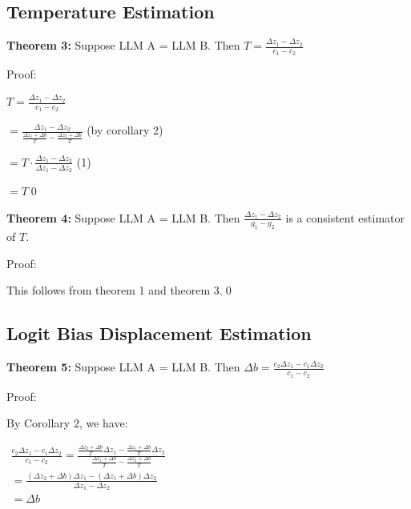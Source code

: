\documentclass{article}
\begin{document}
\subsection{Temperature Estimation}

\textbf{Theorem 3:} Suppose LLM A = LLM B. Then $\displaystyle T=\frac{\Delta z_{1} -\Delta z_{2}}{c_{1} -c_{2}}$

Proof:

$\displaystyle T=\frac{\Delta z_{1} -\Delta z_{2}}{c_{1} -c_{2}}$

$\displaystyle =\frac{\Delta z_{1} -\Delta z_{2}}{\frac{\Delta z_{1} +\Delta b}{T} -\frac{\Delta z_{2} +\Delta b}{T}}$ (by corollary 2)

$\displaystyle =T\cdot \frac{\Delta z_{1} -\Delta z_{2}}{\Delta z_{1} -\Delta z_{2}}$ (1)

$\displaystyle =T$\qed 





\textbf{Theorem 4:} Suppose LLM A = LLM B. Then $\displaystyle \frac{\Delta z_{1} -\Delta z_{2}}{g_{1} -g_{2}}$ is a consistent estimator of $\displaystyle T$.

Proof:

This follows from theorem 1 and theorem 3.\qed 





\subsection{Logit Bias Displacement Estimation}

\textbf{Theorem 5:} Suppose LLM A = LLM B. Then $\displaystyle \Delta b=\frac{c_{2} \Delta z_{1} -c_{1} \Delta z_{2}}{c_{1} -c_{2}}$

Proof:

By Corollary 2, we have:

$\displaystyle  \begin{array}{l}
\frac{c_{2} \Delta z_{1} -c_{1} \Delta z_{2}}{c_{1} -c_{2}} =\frac{\frac{\Delta z_{2} +\Delta b}{T} \Delta z_{1} -\frac{\Delta z_{1} +\Delta b}{T} \Delta z_{2}}{\frac{\Delta z_{1} +\Delta b}{T} -\frac{\Delta z_{2} +\Delta b}{T}}\\
=\frac{\left( \Delta z_{2} +\Delta b\right) \Delta z_{1} -\left( \Delta z_{1} +\Delta b\right) \Delta z_{2}}{\Delta z_{1} -\Delta z_{2}}\\
=\Delta b
\end{array}$
\end{document}
